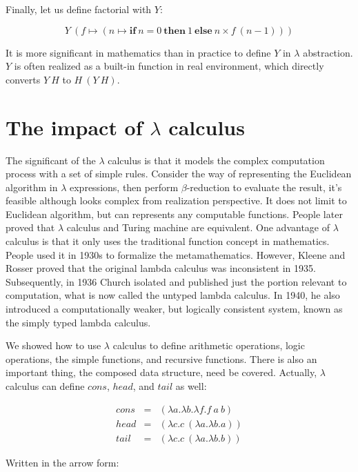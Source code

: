 \documentclass{article}
\begin{document}
Finally, let us define factorial with $Y$:

\[
Y\ (f \mapsto (n \mapsto \textbf{if}\ n = 0\ \textbf{then}\ 1\ \textbf{else}\ n \times f\ (n - 1)))
\]

It is more significant in mathematics than in practice to define $Y$ in $\lambda$ abstraction. $Y$ is often realized as a built-in function in real environment, which directly converts $Y\ H$ to $H\ (Y\ H)$.

\section{The impact of $\lambda$ calculus}

The significant of the $\lambda$ calculus is that it models the complex computation process with a set of simple rules. Consider the way of representing the Euclidean algorithm in $\lambda$ expressions, then perform $\beta$-reduction to evaluate the result, it's feasible although looks complex from realization perspective. It does not limit to Euclidean algorithm, but can represents any computable functions. People later proved that $\lambda$ calculus and Turing machine are equivalent. One advantage of $\lambda$ calculus is that it only uses the traditional function concept in mathematics. People used it in 1930s to formalize the metamathematics. However, Kleene and Rosser proved that the original lambda calculus was inconsistent in 1935. Subsequently, in 1936 Church isolated and published just the portion relevant to computation, what is now called the untyped lambda calculus. In 1940, he also introduced a computationally weaker, but logically consistent system, known as the simply typed lambda calculus.

We showed how to use $\lambda$ calculus to define arithmetic operations, logic operations, the simple functions, and recursive functions. There is also an important thing, the composed data structure, need be covered. Actually, $\lambda$ calculus can define $cons$, $head$, and $tail$ as well:

\[
\begin{array}{rcl}
cons & = & (\lambda a . \lambda b . \lambda f . f\ a\ b) \\
head & = & (\lambda c . c\ (\lambda a . \lambda b . a)) \\
tail & = & (\lambda c . c\ (\lambda a . \lambda b . b))
\end{array}
\]

Written in the arrow form:
\end{document}
